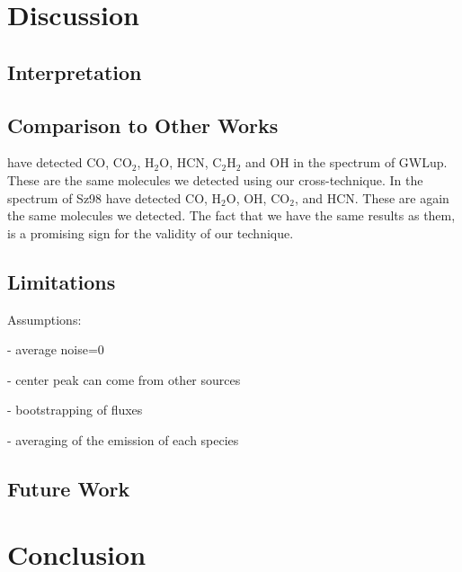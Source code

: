 \documentclass[oneside, single, authoryear, semicolon]{lion-msc}
\newcommand{\4}{$_4$}
\newcommand{\3}{$_3$}
\newcommand{\2}{$_2$}
\begin{document}
\chapter{Discussion}\label{Ch: Discussion}
\section{Interpretation}
\section{Comparison to Other Works}
\cite{Grant_2023} have detected CO, CO\2, H\2O, HCN, C\2H\2 and OH in the spectrum of GWLup. These are the same molecules we detected using our cross-technique. In the spectrum of Sz98 \cite{Gasman_2023} have detected CO, H\2O, OH, CO\2, and HCN. These are again the same molecules we detected. The fact that we have the same results as them, is a promising sign for the validity of our technique. 
\section{Limitations}
Assumptions:

- average noise=0

- center peak can come from other sources

- bootstrapping of fluxes

- averaging of the emission of each species

\section{Future Work}


\chapter{Conclusion}\label{Ch: Conclusion}



\end{document}
